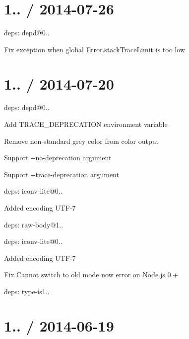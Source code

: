 \section*{1.. / 2014-\/07-\/26 }


\begin{DoxyItemize}
\item deps\+: depd@0..
\begin{DoxyItemize}
\item Fix exception when global {\ttfamily Error.\+stack\+Trace\+Limit} is too low
\end{DoxyItemize}
\end{DoxyItemize}

\section*{1.. / 2014-\/07-\/20 }


\begin{DoxyItemize}
\item deps\+: depd@0..
\begin{DoxyItemize}
\item Add {\ttfamily T\+R\+A\+C\+E\+\_\+\+D\+E\+P\+R\+E\+C\+A\+T\+I\+O\+N} environment variable
\item Remove non-\/standard grey color from color output
\item Support {\ttfamily -\/-\/no-\/deprecation} argument
\item Support {\ttfamily -\/-\/trace-\/deprecation} argument
\end{DoxyItemize}
\item deps\+: iconv-\/lite@0..
\begin{DoxyItemize}
\item Added encoding U\+T\+F-\/7
\end{DoxyItemize}
\item deps\+: raw-\/body@1..
\begin{DoxyItemize}
\item deps\+: iconv-\/lite@0..
\item Added encoding U\+T\+F-\/7
\item Fix {\ttfamily Cannot switch to old mode now} error on Node.\+js 0.+
\end{DoxyItemize}
\item deps\+: type-\/is1..
\end{DoxyItemize}

\section*{1.. / 2014-\/06-\/19 }


